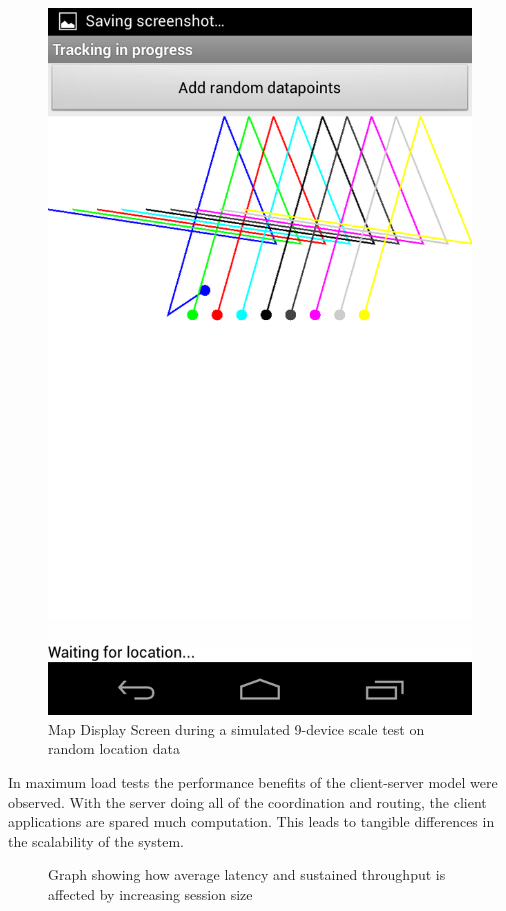 \begin{figure}[h]
\centering
\includegraphics[scale=0.15]{scale}
\caption{Map Display Screen during a simulated 9-device scale test on random location data}
\label{fig:scale}
\end{figure}

In maximum load tests the performance benefits of the client-server model were observed. With the server doing all of the coordination and routing, the client applications are spared much computation. This leads to tangible differences in the scalability of the system.

\begin{figure}[h]
\centering

\caption{Graph showing how average latency and sustained throughput is affected by increasing session size}
\label{fig:scale}
\end{figure}

